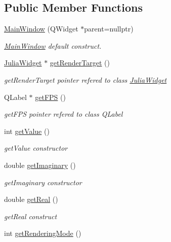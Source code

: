 \subsection*{Public Member Functions}
\begin{DoxyCompactItemize}
\item 
\hyperlink{classMainWindow_a996c5a2b6f77944776856f08ec30858d}{Main\+Window} (Q\+Widget $\ast$parent=nullptr)
\begin{DoxyCompactList}\small\item\em \hyperlink{classMainWindow}{Main\+Window} default construct. \end{DoxyCompactList}\item 
\hyperlink{classJuliaWidget}{Julia\+Widget} $\ast$ \hyperlink{classMainWindow_a7ee8a672f617c1eaa5a83b6db735e51b}{get\+Render\+Target} ()
\begin{DoxyCompactList}\small\item\em get\+Render\+Target pointer refered to class \hyperlink{classJuliaWidget}{Julia\+Widget} \end{DoxyCompactList}\item 
Q\+Label $\ast$ \hyperlink{classMainWindow_adc53673d5fb73e021c7bde51a3b32055}{get\+F\+PS} ()
\begin{DoxyCompactList}\small\item\em get\+F\+PS pointer refered to class Q\+Label \end{DoxyCompactList}\item 
int \hyperlink{classMainWindow_a60d21468b55f475cc6187e577f3237de}{get\+Value} ()
\begin{DoxyCompactList}\small\item\em get\+Value constructor \end{DoxyCompactList}\item 
double \hyperlink{classMainWindow_a53e364bc9d8029ce6cac0170985fca81}{get\+Imaginary} ()
\begin{DoxyCompactList}\small\item\em get\+Imaginary constructor \end{DoxyCompactList}\item 
double \hyperlink{classMainWindow_ac2e149fa1e1eacf3166c3fb6943a6623}{get\+Real} ()
\begin{DoxyCompactList}\small\item\em get\+Real construct \end{DoxyCompactList}\item 
int \hyperlink{classMainWindow_adfbd73af7cca6690ea0dc032d08770f2}{get\+Rendering\+Mode} ()

\end{DoxyCompactItemize}
